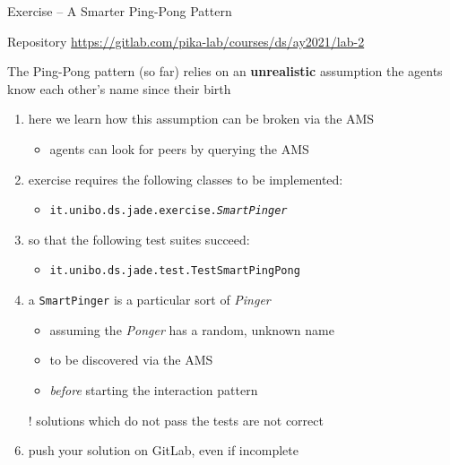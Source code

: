 \documentclass{beamer}\mode<presentation>{\usetheme{AMSCesenaPurpleAndGold}}
\begin{document}
\begin{frame}[c,allowframebreaks]{Exercise \currentExercise{} -- A Smarter Ping-Pong Pattern}
	
	\begin{block}{Repository}\centering
		\url{https://gitlab.com/pika-lab/courses/ds/ay2021/lab-2}
	\end{block}
	
	\bigskip
	
	\begin{alertblock}{The Ping-Pong pattern (so far) relies on an \textbf{unrealistic} assumption}
		\centering
		the agents know each other's name since their birth
	\end{alertblock}
	\medskip
	\begin{enumerate}
		
		\item here we learn how this assumption can be broken via the AMS
		\begin{itemize}
			\item \jade{} agents can \alert{look for} peers by querying the AMS
		\end{itemize} 
		
		\medskip
		
		\item exercise \currentExercise{} requires the following classes to be implemented:
		\begin{itemize}
			\item \texttt{it.unibo.ds.jade.\alert{exercise.\textit{SmartPinger}}}
		\end{itemize}
		
		\framebreak
		
		\item so that the following test suites succeed:
		\begin{itemize}
			\item \texttt{it.unibo.ds.jade.test.\alert{TestSmartPingPong}}
		\end{itemize}
	
		\medskip
		
		\item a \texttt{SmartPinger} is a particular sort of \textit{Pinger} 
		\begin{itemize}
			\item assuming the \textit{Ponger} has a random, unknown name
			\item to be discovered via the AMS
			\item \emph{before} starting the interaction pattern
		\end{itemize}
		
		\medskip
		
		\item[!] solutions which do not pass the tests are not correct
		
		\medskip
		
		\item push your solution on GitLab, \alert{even if incomplete}
		
	\end{enumerate}
	
\end{frame}
\end{document}
